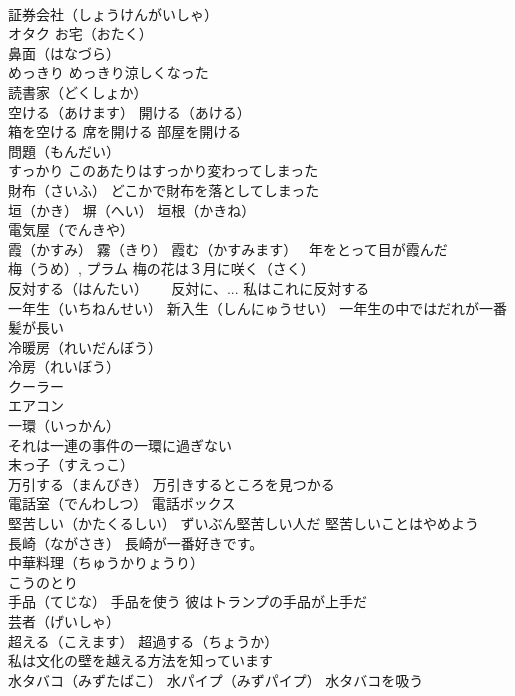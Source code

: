 \documentclass[8pt]{extreport}
\begin{document}
\begin{CJK}{UTF8}{min}
\\	証券会社（しょうけんがいしゃ）
\\	オタク お宅（おたく）
\\	鼻面（はなづら）
\\	めっきり めっきり涼しくなった
\\	読書家（どくしょか）
\\	空ける（あけます） 開ける（あける）
\\	箱を空ける 席を開ける 部屋を開ける
\\	問題（もんだい）
\\	すっかり このあたりはすっかり変わってしまった
\\	財布（さいふ） どこかで財布を落としてしまった
\\	垣（かき） 塀（へい） 垣根（かきね）
\\	電気屋（でんきや）
\\	霞（かすみ） 霧（きり） 霞む（かすみます）　 年をとって目が霞んだ
\\	梅（うめ）, プラム 梅の花は３月に咲く（さく）
\\	反対する（はんたい） 　 反対に、... 私はこれに反対する
\\	一年生（いちねんせい） 新入生（しんにゅうせい） 一年生の中ではだれが一番髪が長い
\\	冷暖房（れいだんぼう） 
\\	冷房（れいぼう） 
\\	クーラー 
\\	エアコン 
\\	一環（いっかん） 
\\	それは一連の事件の一環に過ぎない
\\	末っ子（すえっこ）
\\	万引する（まんびき） 万引きするところを見つかる
\\	電話室（でんわしつ） 電話ボックス
\\	堅苦しい（かたくるしい） ずいぶん堅苦しい人だ 堅苦しいことはやめよう
\\	長崎（ながさき） 長崎が一番好きです。
\\	中華料理（ちゅうかりょうり）
\\	こうのとり
\\	手品（てじな） 手品を使う 彼はトランプの手品が上手だ
\\	芸者（げいしゃ）
\\	超える（こえます） 超過する（ちょうか）
\\	私は文化の壁を越える方法を知っています
\\	水タバコ（みずたばこ） 水パイプ（みずパイプ） 水タバコを吸う

\end{CJK}
\end{document}
